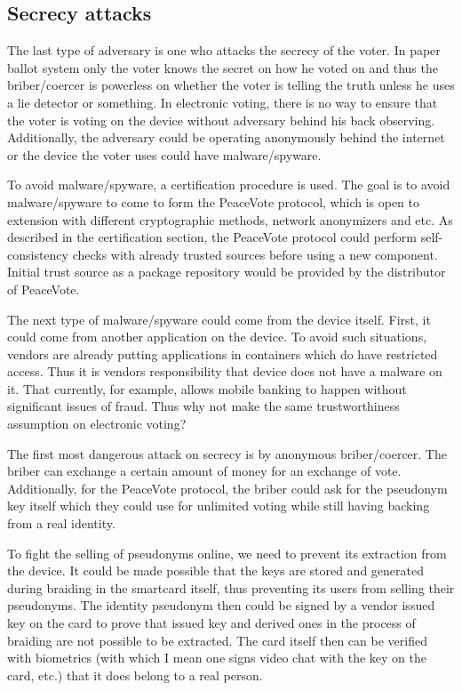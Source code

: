 \documentclass[12pt,a4paper]{article}
\let\Oldsubsection\subsection
\renewcommand{\subsection}{\FloatBarrier\Oldsubsection}
\begin{document}
\subsection{Secrecy attacks}
The last type of adversary is one who attacks the secrecy of the voter. In paper ballot system only the voter knows the secret on how he voted on and thus the briber/coercer is powerless on whether the voter is telling the truth unless he uses a lie detector or something. In electronic voting, there is no way to ensure that the voter is voting on the device without adversary behind his back observing. Additionally, the adversary could be operating anonymously behind the internet or the device the voter uses could have malware/spyware.\par
To avoid malware/spyware, a certification procedure is used. The goal is to avoid malware/spyware to come to form the PeaceVote protocol, which is open to extension with different cryptographic methods, network anonymizers and etc. As described in the certification section, the PeaceVote protocol could perform self-consistency checks with already trusted sources before using a new component. Initial trust source as a package repository would be provided by the distributor of PeaceVote.\par
The next type of malware/spyware could come from the device itself. First, it could come from another application on the device. To avoid such situations, vendors are already putting applications in containers which do have restricted access. Thus it is vendors responsibility that device does not have a malware on it. That currently, for example, allows mobile banking to happen without significant issues of fraud. Thus why not make the same trustworthiness assumption on electronic voting?\par
The first most dangerous attack on secrecy is by anonymous briber/coercer. The briber can exchange a certain amount of money for an exchange of vote. Additionally, for the PeaceVote protocol, the briber could ask for the pseudonym key itself which they could use for unlimited voting while still having backing from a real identity.\par
To fight the selling of pseudonyms online, we need to prevent its extraction from the device. It could be made possible that the keys are stored and generated during braiding in the smartcard itself, thus preventing its users from selling their pseudonyms. The identity pseudonym then could be signed by a vendor issued key on the card to prove that issued key and derived ones in the process of braiding are not possible to be extracted. The card itself then can be verified with biometrics (with which I mean one signs video chat with the key on the card, etc.) that it does belong to a real person.\par
\end{document}
